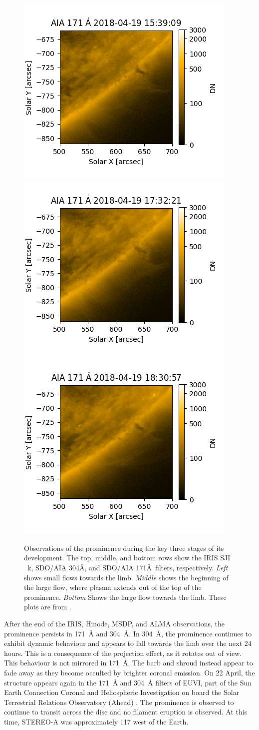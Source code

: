 \begin{figure}
    \includegraphics[width=0.32\linewidth]{./01Observations/figs/20180419/171_0.png}
    \includegraphics[width=0.32\linewidth]{./01Observations/figs/20180419/171_1.png}
    \includegraphics[width=0.32\linewidth]{./01Observations/figs/20180419/171_2.png}
    
    \caption[The key three stages of the development of the prominence.]{Observations of the prominence during the key three stages of its development. The top, middle, and bottom rows show the IRIS SJI \mgii~k, SDO/AIA 304\AA, and SDO/AIA 171\AA\ filters, respectively. \textit{Left} shows small flows towards the limb. \textit{Middle} shows the beginning of the large flow, where plasma extends out of the top of the prominence. \textit{Bottom} Shows the large flow towards the limb. These plots are from \cite{peat_solar_2021}.}
    \label{threestages}
\end{figure}

After the end of the IRIS, Hinode, MSDP, and ALMA observations, the prominence persists in 171~\AA{} and 304~\AA. In 304~\AA, the prominence continues to exhibit dynamic behaviour and appears to fall towards the limb over the next 24 hours. This is a consequence of the projection effect, as it rotates out of view. This behaviour is not mirrored in 171~\AA. The barb and shroud instead appear to fade away as they become occulted by brighter coronal emission. On 22 April, the structure appears again in the 171~\AA{} and 304~\AA{} filters of EUVI, part of the Sun Earth Connection Coronal and Heliospheric Investigation \citep[SECCHI; ][]{howard_sun_2008} on board the Solar Terrestrial Relations Observatory (Ahead) \citep[See Fig \ref{secchi}; STEREO-A; ][]{driesman_stereo_2008}. The prominence is observed to continue to transit across the disc and no filament eruption is observed. At this time, STEREO-A was approximately 117\degr{} west of the Earth.

